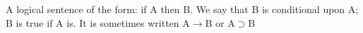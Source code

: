 A logical sentence of the form: if A then B. We say that B is conditional upon A;
B is true if A is. It is sometimes written $\mathrm{A} \rightarrow \text{B or A} 
\supset \mathrm{B} $